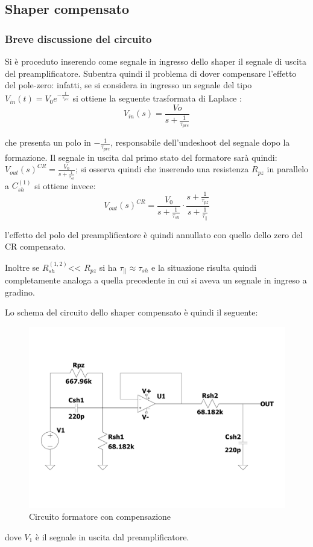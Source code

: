 \documentclass{article}
\begin{document}
\subsection{Shaper compensato}
\subsubsection{Breve discussione del circuito}
Si è proceduto inserendo come segnale in ingresso dello shaper il segnale di uscita del preamplificatore. Subentra quindi il problema di dover compensare
l'effetto del pole-zero: infatti, se si considera in ingresso un segnale del tipo $V_{in}(t)=V_0e^{-\frac{t}{\tau_{pre}}}$ si ottiene la seguente trasformata
di Laplace :
$$
V_{in}(s)=\frac{Vo}{s+\frac{1}{\tau_{pre}}}
$$

che presenta un polo in $-\frac{1}{\tau_{pre}} $,  responsabile dell’undeshoot del segnale dopo la formazione.
Il segnale in uscita dal primo stato del formatore sarà quindi: $V_{out}(s)^{CR}=\frac{V_{0}}{s+\frac{1}{\tau_{sh}}}$;
si osserva quindi che inserendo una resistenza $R_{pz}$ in parallelo a $C_{sh}^{(1)}$ si ottiene invece:
$$
V_{out}(s)^{CR}=\frac{V_{0}}{s+\frac{1}{\tau_{sh}}}\cdot \frac{s+\frac{1}{\tau_{pz}}}{s+\frac{1}{\tau_{||}}}
$$

l’effetto del polo del preamplificatore è quindi annullato con quello dello zero del CR compensato.

Inoltre se $R_{sh}^{(1,2)}$<< $R_{pz}$ si ha $\tau_{||} \approx \tau_{sh}$ e la situazione risulta quindi completamente 
analoga a quella precedente in cui si aveva un segnale in ingreso a gradino.

Lo schema del circuito dello shaper compensato è quindi il seguente:
 
\begin{center}
    \begin{figure}[H]
    \centering
    \includegraphics[scale=0.1875, angle=0]{shapercomp.pdf}
    \caption{Circuito formatore con compensazione}
    \label{fig:shaper}
    \end{figure}
\end{center}
dove $V_1$ è il segnale in uscita dal preamplificatore.
\end{document}
